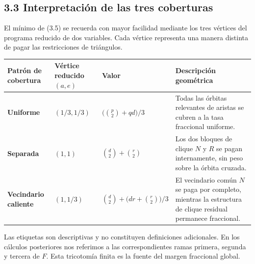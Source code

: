\documentclass[
  spanish,
  11pt,
  a4paper,
]{article}
\newcounter{none} %
\begin{document}
\subsection{3.3 Interpretación de las tres coberturas}\label{interpretaciuxf3n-de-las-tres-coberturas}

El mínimo de (3.5) se recuerda con mayor facilidad mediante los tres vértices del programa reducido de dos variables. Cada vértice representa una manera distinta de pagar las restricciones de triángulos.

{\def\LTcaptype{none} %
\begin{longtable}[]{@{}
  >{\raggedright\arraybackslash}p{}
  >{\raggedleft\arraybackslash}p{}
  >{\raggedleft\arraybackslash}p{}
  >{\raggedright\arraybackslash}p{}@{}}
\toprule\noalign{}
\begin{minipage}[b]{\linewidth}\raggedright
Patrón de cobertura
\end{minipage} & \begin{minipage}[b]{\linewidth}\raggedleft
Vértice reducido \((a,e)\)
\end{minipage} & \begin{minipage}[b]{\linewidth}\raggedleft
Valor
\end{minipage} & \begin{minipage}[b]{\linewidth}\raggedright
Descripción geométrica
\end{minipage} \\
\midrule\noalign{}
\endhead
\bottomrule\noalign{}
\endlastfoot
\textbf{Uniforme} & \((1/3,1/3)\) & \(\bigl(\binom p2+qd\bigr)/3\) & Todas las órbitas relevantes de aristas se cubren a la tasa fraccional uniforme. \\
\textbf{Separada} & \((1,1)\) & \(\binom d2+\binom r2\) & Los dos bloques de clique \(N\) y \(R\) se pagan internamente, sin peso sobre la órbita cruzada. \\
\textbf{Vecindario caliente} & \((1,1/3)\) & \(\binom d2+\bigl(dr+\binom r2\bigr)/3\) & El vecindario común \(N\) se paga por completo, mientras la estructura de clique residual permanece fraccional. \\
\end{longtable}
}

Las etiquetas son descriptivas y no constituyen definiciones adicionales. En los cálculos posteriores nos referimos a las correspondientes ramas primera, segunda y tercera de \(F\). Esta tricotomía finita es la fuente del margen fraccional global.
\end{document}
